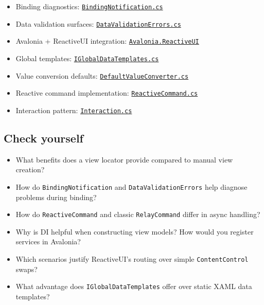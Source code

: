 \begin{itemize}
\tightlist
\item
  Binding diagnostics:
  \href{https://github.com/AvaloniaUI/Avalonia/blob/master/src/Avalonia.Base/Data/BindingNotification.cs}{\passthrough{\lstinline!BindingNotification.cs!}}
\item
  Data validation surfaces:
  \href{https://github.com/AvaloniaUI/Avalonia/blob/master/src/Avalonia.Controls/DataValidationErrors.cs}{\passthrough{\lstinline!DataValidationErrors.cs!}}
\item
  Avalonia + ReactiveUI integration:
  \href{https://github.com/AvaloniaUI/Avalonia/tree/master/src/Avalonia.ReactiveUI}{\passthrough{\lstinline!Avalonia.ReactiveUI!}}
\item
  Global templates:
  \href{https://github.com/AvaloniaUI/Avalonia/blob/master/src/Avalonia.Controls/IGlobalDataTemplates.cs}{\passthrough{\lstinline!IGlobalDataTemplates.cs!}}
\item
  Value conversion defaults:
  \href{https://github.com/AvaloniaUI/Avalonia/blob/master/src/Avalonia.Base/Data/Converters/DefaultValueConverter.cs}{\passthrough{\lstinline!DefaultValueConverter.cs!}}
\item
  Reactive command implementation:
  \href{https://github.com/reactiveui/ReactiveUI/blob/main/src/ReactiveUI/ReactiveCommand.cs}{\passthrough{\lstinline!ReactiveCommand.cs!}}
\item
  Interaction pattern:
  \href{https://github.com/reactiveui/ReactiveUI/blob/main/src/ReactiveUI/Interaction.cs}{\passthrough{\lstinline!Interaction.cs!}}
\end{itemize}

\subsection{Check yourself}\label{check-yourself-9}

\begin{itemize}
\tightlist
\item
  What benefits does a view locator provide compared to manual view
  creation?
\item
  How do \passthrough{\lstinline!BindingNotification!} and
  \passthrough{\lstinline!DataValidationErrors!} help diagnose problems
  during binding?
\item
  How do \passthrough{\lstinline!ReactiveCommand!} and classic
  \passthrough{\lstinline!RelayCommand!} differ in async handling?
\item
  Why is DI helpful when constructing view models? How would you
  register services in Avalonia?
\item
  Which scenarios justify ReactiveUI's routing over simple
  \passthrough{\lstinline!ContentControl!} swaps?
\item
  What advantage does \passthrough{\lstinline!IGlobalDataTemplates!}
  offer over static XAML data templates?
\end{itemize}

